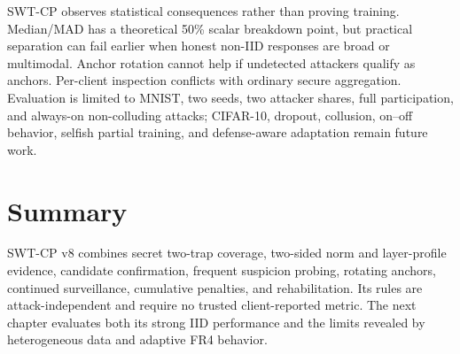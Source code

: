 SWT-CP observes statistical consequences rather than proving training. Median/MAD has a theoretical 50\% scalar breakdown point, but practical separation can fail earlier when honest non-IID responses are broad or multimodal. Anchor rotation cannot help if undetected attackers qualify as anchors. Per-client inspection conflicts with ordinary secure aggregation. Evaluation is limited to MNIST, two seeds, two attacker shares, full participation, and always-on non-colluding attacks; CIFAR-10, dropout, collusion, on--off behavior, selfish partial training, and defense-aware adaptation remain future work.

\section{Summary}

SWT-CP v8 combines secret two-trap coverage, two-sided norm and layer-profile evidence, candidate confirmation, frequent suspicion probing, rotating anchors, continued surveillance, cumulative penalties, and rehabilitation. Its rules are attack-independent and require no trusted client-reported metric. The next chapter evaluates both its strong IID performance and the limits revealed by heterogeneous data and adaptive FR4 behavior.
